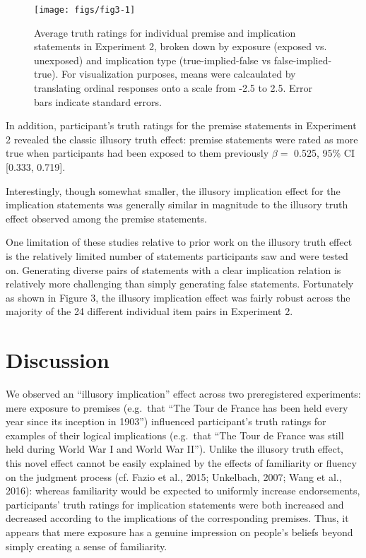 \documentclass[10pt, letterpaper]{article}
\newenvironment{CodeChunk}{}{}
\begin{document}
\begin{CodeChunk}
\begin{figure*}[!hbt]

{\centering \texttt{[image: figs/fig3-1]} 

}

\caption[Average truth ratings for individual premise and implication statements in Experiment 2, broken down by exposure (exposed vs]{Average truth ratings for individual premise and implication statements in Experiment 2, broken down by exposure (exposed vs. unexposed) and implication type (true-implied-false vs false-implied-true). For visualization purposes, means were calcaulated by translating ordinal responses onto a scale from -2.5 to 2.5. Error bars indicate standard errors.}\label{fig:fig3}
\end{figure*}
\end{CodeChunk}

In addition, participant's truth ratings for the premise statements in
Experiment 2 revealed the classic illusory truth effect: premise
statements were rated as more true when participants had been exposed to
them previously \(\beta =\) 0.525, 95\% CI {[}0.333, 0.719{]}.

Interestingly, though somewhat smaller, the illusory implication effect
for the implication statements was generally similar in magnitude to the
illusory truth effect observed among the premise statements.

One limitation of these studies relative to prior work on the illusory
truth effect is the relatively limited number of statements participants
saw and were tested on. Generating diverse pairs of statements with a
clear implication relation is relatively more challenging than simply
generating false statements. Fortunately as shown in Figure 3, the
illusory implication effect was fairly robust across the majority of the
24 different individual item pairs in Experiment 2.

\hypertarget{discussion}{%
\section{Discussion}\label{discussion}}

We observed an ``illusory implication'' effect across two preregistered
experiments: mere exposure to premises (e.g.~that ``The Tour de France
has been held every year since its inception in 1903'') influenced
participant's truth ratings for examples of their logical implications
(e.g.~that ``The Tour de France was still held during World War I and
World War II''). Unlike the illusory truth effect, this novel effect
cannot be easily explained by the effects of familiarity or fluency on
the judgment process (cf. Fazio et al., 2015; Unkelbach, 2007; Wang et
al., 2016): whereas familiarity would be expected to uniformly increase
endorsements, participants' truth ratings for implication statements
were both increased and decreased according to the implications of the
corresponding premises. Thus, it appears that mere exposure has a
genuine impression on people's beliefs beyond simply creating a sense of
familiarity.
\end{document}
